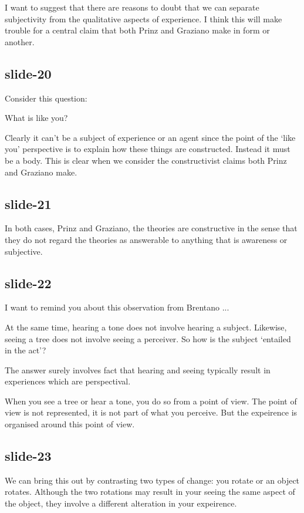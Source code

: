 \documentclass[14pt,\papersize]{extarticle}
\begin{document}
I want to suggest that there are reasons to doubt that we can separate
subjectivity from the qualitative aspects of experience.
I think this will make trouble for a central claim that both Prinz and 
Graziano make in form or another.
 
\subsection{slide-20}
Consider this question:
 
What is like you?
 
Clearly it can't be a subject of experience or an agent since the point
of the ‘like you’ perspective is to explain how these things are 
constructed.
Instead it must be a body.
This is clear when we consider the constructivist claims both Prinz
and Graziano make.
 
\subsection{slide-21}
In both cases, Prinz and Graziano, the theories are constructive in the
sense that they do not regard the theories as answerable to anything
that is awareness or subjective.
 
\subsection{slide-22}
I want to remind you about this observation from Brentano ...
 
At the same time, hearing a tone does not involve hearing a subject.
Likewise, seeing a tree does not involve seeing a perceiver.
So how is the subject ‘entailed in the act’?
 
The answer surely involves fact that hearing and seeing typically
result in experiences which are perspectival.
 
When you see a tree or hear a tone, you do so from a point of view.
The point of view is not represented, it is not part of what you perceive.
But the expeirence is organised around this point of view.
 
\subsection{slide-23}
We can bring this out by contrasting two types of change:
you rotate or an object rotates.
Although the two rotations may result in your seeing the same aspect of the
object, they involve a different alteration in your expeirence.
 
\end{document}
